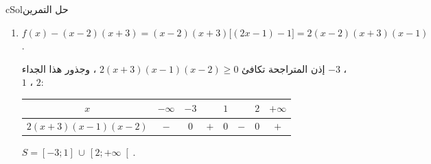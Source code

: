 \documentclass[12pt,a4paper]{article}
\newcounter{exo}
\newenvironment{hal}{\Needspace{12\baselineskip}\begin{otherlanguage}{english}\begin{arbox}[breakable]{cSol}{حل التمرين \theexo}}{\end{arbox}\end{otherlanguage}}
\begin{document}
\begin{hal}
\begin{enumerate}
\begin{center}
\begin{tabular}{|C|C|C|C|C|C|C|C|}
$f(x)$ & $-$ & $0$ & $+$ & $0$ & $-$ & $0$ & $+$\\\hline
\end{tabular}
\end{center}
$f(x)\le0\iff$ \ $\boxed{S=\left]-\infty;-3\right]\,\cup\,\left[\dfrac12;2\right]}$.
\item $f(x)-(x-2)(x+3)=(x-2)(x+3)\big[(2x-1)-1\big]=2(x-2)(x+3)(x-1)$.\par
إذن المتراجحة تكافئ $2(x+3)(x-1)(x-2)\ge0$ ، وجذور هذا الجداء $-3$ ، $1$ ، $2$:
\begin{center}
\renewcommand{\arraystretch}{1.4}
\begin{tabular}{|C|C|C|C|C|C|C|C|}\hline
{}$x$ & $-\infty$ \quad & $-3$ & & $1$ & & $2$ & \quad $+\infty$\\\hline
$2(x+3)(x-1)(x-2)$ & $-$ & $0$ & $+$ & $0$ & $-$ & $0$ & $+$\\\hline
\end{tabular}
\end{center}
$\boxed{S=\left[-3;1\right]\,\cup\,\left[2;+\infty\right[}$.
\end{enumerate}
\end{hal}

\end{document}

